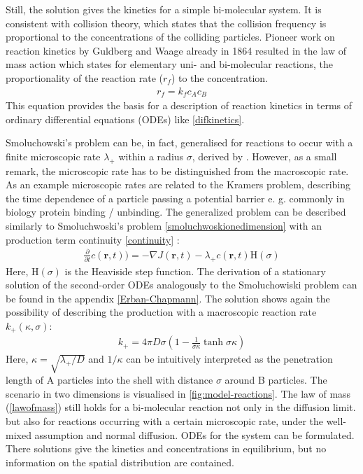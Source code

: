 \documentclass[
  a4paper,BCOR10mm,oneside,
  headsepline,footsepline,%
  fleqn,openbib
]{scrbook}
\begin{document}
Still, the solution gives the kinetics for a simple bi-molecular system. It is consistent with collision theory, which states that the collision frequency is proportional to the concentrations of the colliding particles. Pioneer work on reaction kinetics by Guldberg and Waage already in 1864 \cite{Waage1986} resulted in the law of mass action which states for elementary uni- and bi-molecular reactions, the proportionality of the reaction rate ($r_f$) to the concentration.
\begin{align} \label{lawofmass}
 r_f=k_f c_A c_B
\end{align}
This equation provides the basis for a description of reaction kinetics in terms of ordinary differential equations (ODEs) like \cref{difkinetics}.\par
Smoluchowski's problem can be, in fact, generalised for reactions to occur with a finite microscopic rate $\lambda_{+}$ within a radius $\sigma$, derived by \citet{Erban2009}.  However, as a small remark, the microscopic rate has to be distinguished from the macroscopic rate. As an example microscopic rates are related to the Kramers problem, describing the time dependence of a particle passing a potential barrier e. g. commonly in biology protein binding / unbinding. The generalized problem can be described similarly to Smoluchwoski's problem \cref{smoluchwoskionedimension}  with an production term  continuity  \cref{continuity} :
\begin{align}
\frac{\partial}{\partial t} c(\bm{r},t))=- \nabla J(\bm{r},t)- \lambda_+ c(\bm{r},t) \mathrm{H}(\sigma)
\end{align}
Here, $\mathrm{H}(\sigma)$ is the Heaviside step function. The derivation of a  stationary solution of the second-order ODEs analogously to the Smoluchowiski problem can be found in the appendix \ref{Erban-Chapmann}. The solution shows again the possibility of describing the production with a macroscopic reaction rate $k_{+}(\kappa, \sigma)$:
\begin{align} \label{kalphaerbanchepmann}
k_{+}=4 \pi D \sigma \left( 1-\frac{1}{\sigma \kappa} \tanh{\sigma \kappa}\right)
\end{align}
Here, $\kappa=\sqrt{\lambda_+/D}$ and $1/\kappa$ can be intuitively interpreted as the penetration length of A particles into the shell with distance $\sigma$ around B particles. The scenario in two dimensions is visualised in \cref{fig:model-reactions}. The law of mass (\cref{lawofmass}) still holds for a bi-molecular reaction not only in the diffusion limit. but also for reactions occurring with a certain microscopic rate, under the well-mixed assumption and normal diffusion.  ODEs for the system can be formulated. There solutions give the kinetics and concentrations in equilibrium, but no information on the spatial distribution are contained.
\end{document}
